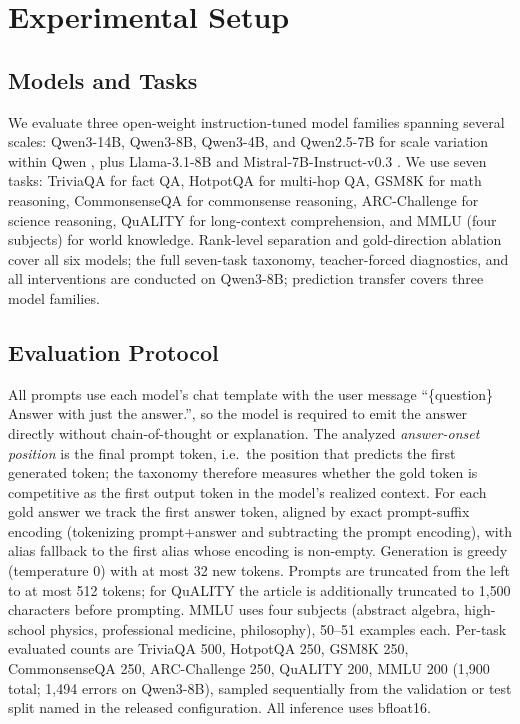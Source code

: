 \documentclass{article} %
\begin{document}
\section{Experimental Setup}

\subsection{Models and Tasks}
We evaluate three open-weight instruction-tuned model families spanning several scales: Qwen3-14B, Qwen3-8B, Qwen3-4B, and Qwen2.5-7B for scale variation within Qwen \citep{qwen3}, plus Llama-3.1-8B \citep{dubey2024llama} and Mistral-7B-Instruct-v0.3 \citep{jiang2023mistral}. We use seven tasks: TriviaQA \citep{joshi2017triviaqa} for fact QA, HotpotQA \citep{yang2018hotpotqa} for multi-hop QA, GSM8K \citep{cobbe2021gsm8k} for math reasoning, CommonsenseQA \citep{talmor2019commonsenseqa} for commonsense reasoning, ARC-Challenge \citep{clark2018arc} for science reasoning, QuALITY \citep{pang2022quality} for long-context comprehension, and MMLU (four subjects) \citep{hendrycks2021mmlu} for world knowledge. Rank-level separation and gold-direction ablation cover all six models; the full seven-task taxonomy, teacher-forced diagnostics, and all interventions are conducted on Qwen3-8B; prediction transfer covers three model families.

\subsection{Evaluation Protocol}
All prompts use each model's chat template with the user message ``\{question\} Answer with just the answer.'', so the model is required to emit the answer directly without chain-of-thought or explanation. The analyzed \emph{answer-onset position} is the final prompt token, i.e.\ the position that predicts the first generated token; the taxonomy therefore measures whether the gold token is competitive as the first output token in the model's realized context. For each gold answer we track the first answer token, aligned by exact prompt-suffix encoding (tokenizing prompt+answer and subtracting the prompt encoding), with alias fallback to the first alias whose encoding is non-empty. Generation is greedy (temperature 0) with at most 32 new tokens. Prompts are truncated from the left to at most 512 tokens; for QuALITY the article is additionally truncated to 1{,}500 characters before prompting. MMLU uses four subjects (abstract algebra, high-school physics, professional medicine, philosophy), 50--51 examples each. Per-task evaluated counts are TriviaQA 500, HotpotQA 250, GSM8K 250, CommonsenseQA 250, ARC-Challenge 250, QuALITY 200, MMLU 200 (1{,}900 total; 1{,}494 errors on Qwen3-8B), sampled sequentially from the validation or test split named in the released configuration. All inference uses bfloat16.
\end{document}
